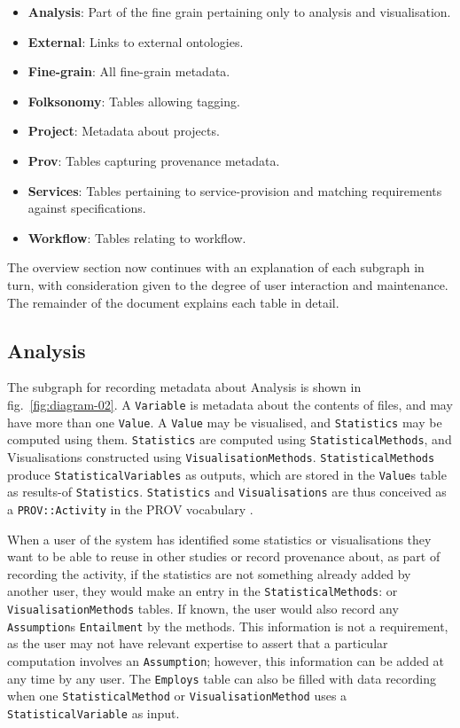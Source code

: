 \documentclass[
]{article}
\begin{document}
\begin{itemize}
\item
  \textbf{Analysis}: Part of the fine grain pertaining only to analysis
  and visualisation.
\item
  \textbf{External}: Links to external ontologies.
\item
  \textbf{Fine-grain}: All fine-grain metadata.
\item
  \textbf{Folksonomy}: Tables allowing tagging.
\item
  \textbf{Project}: Metadata about projects.
\item
  \textbf{Prov}: Tables capturing provenance metadata.
\item
  \textbf{Services}: Tables pertaining to service-provision and matching
  requirements against specifications.
\item
  \textbf{Workflow}: Tables relating to workflow.
\end{itemize}

The overview section now continues with an explanation of each subgraph
in turn, with consideration given to the degree of user interaction and
maintenance. The remainder of the document explains each table in
detail.

\subsection{Analysis}\label{sec:analysis}

The subgraph for recording metadata about Analysis is shown in
fig.~\ref{fig:diagram-02}. A \texttt{Variable} is metadata about the
contents of files, and may have more than one \texttt{Value}. A
\texttt{Value} may be visualised, and \texttt{Statistics} may be
computed using them. \texttt{Statistics} are computed using
\texttt{StatisticalMethods}, and Visualisations constructed using
\texttt{VisualisationMethods}. \texttt{StatisticalMethods} produce
\texttt{StatisticalVariables} as outputs, which are stored in the
\texttt{Value}s table as results-of \texttt{Statistics}.
\texttt{Statistics} and \texttt{Visualisations} are thus conceived as a
\texttt{PROV::Activity} in the PROV vocabulary \citep{gao2020big}.

When a user of the system has identified some statistics or
visualisations they want to be able to reuse in other studies or record
provenance about, as part of recording the activity, if the statistics
are not something already added by another user, they would make an
entry in the \texttt{StatisticalMethods}: or
\texttt{VisualisationMethods} tables. If known, the user would also
record any \texttt{Assumption}s \texttt{Entailment} by the methods. This
information is not a requirement, as the user may not have relevant
expertise to assert that a particular computation involves an
\texttt{Assumption}; however, this information can be added at any time
by any user. The \texttt{Employs} table can also be filled with data
recording when one \texttt{StatisticalMethod} or
\texttt{VisualisationMethod} uses a \texttt{StatisticalVariable} as
input.
\end{document}
